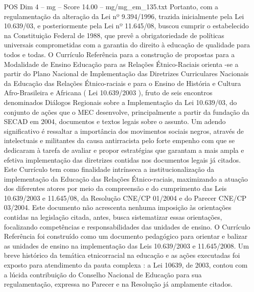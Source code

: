 \begin{textsample}{POS Dim 4 – mg – Score 14.00 – mg/mg\_em\_135.txt}
Portanto, com a regulamentação da alteração da Lei nº 9.394/1996, trazida inicialmente pela Lei 10.639/03, e posteriormente pela Lei nº 11.645/08, buscou cumprir o estabelecido na Constituição Federal de 1988, que prevê a obrigatoriedade de políticas universais comprometidas com a garantia do direito à educação de qualidade para todos e todas.
O Currículo Referência para a construção de propostas para a Modalidade de Ensino Educação para as Relações Étnico-Raciais orienta -se a partir do Plano Nacional de Implementação das Diretrizes Curriculares Nacionais da Educação das Relações Étnico-raciais e para o Ensino de História e Cultura Afro-Brasileira e Africana ( Lei 10.639/2003 ), fruto de seis encontros denominados Diálogos Regionais sobre a Implementação da Lei 10.639/03, do conjunto de ações que o MEC desenvolve, principalmente a partir da fundação da SECAD em 2004, documentos e textos legais sobre o assunto.
Um adendo significativo é ressaltar a importância dos movimentos sociais negros, através de intelectuais e militantes da causa antirracista pelo forte empenho com que se dedicaram à tarefa de avaliar e propor estratégias que garantam a mais ampla e efetiva implementação das diretrizes contidas nos documentos legais já citados.
Este Currículo tem como finalidade intrínseca a institucionalização da implementação da Educação das Relações Étnico-raciais, maximizando a atuação dos diferentes atores por meio da compreensão e do cumprimento das Leis 10.639/2003 e 11.645/08, da Resolução CNE/CP 01/2004 e do Parecer CNE/CP 03/2004.
Este documento não acrescenta nenhuma imposição às orientações contidas na legislação citada, antes, busca sistematizar essas orientações, focalizando competências e responsabilidades das unidades de ensino.
O Currículo Referência foi construído como um documento pedagógico para orientar e balizar as unidades de ensino na implementação das Leis 10.639/2003 e 11.645/2008.
Um breve histórico da temática etnicorracial na educação e as ações executadas foi exposto para atendimento da pauta complexa : a Lei 10639, de 2003, contou com a lúcida contribuição do Conselho Nacional de Educação para sua regulamentação, expressa no Parecer e na Resolução já amplamente citados.

\end{textsample}

